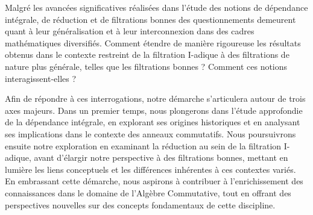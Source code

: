 Malgré les avancées significatives réalisées dans l'étude des notions de dépendance intégrale, de réduction et de filtrations bonnes des questionnements demeurent quant à leur généralisation et à leur interconnexion dans des cadres mathématiques diversifiés. Comment étendre de manière rigoureuse les résultats obtenus dans le contexte restreint de la filtration I-adique à des filtrations de nature plus générale, telles que les filtrations bonnes ? Comment ces notions interagissent-elles ? 

Afin de répondre à ces interrogations, notre démarche s'articulera autour de trois axes majeurs. Dans un premier temps, nous plongerons dans l'étude approfondie de la dépendance intégrale, en explorant ses origines historiques et en analysant ses implications dans le contexte des anneaux commutatifs. Nous poursuivrons ensuite notre exploration en examinant la réduction au sein de la filtration I-adique, avant d'élargir notre perspective à des filtrations bonnes, mettant en lumière les liens conceptuels et les différences inhérentes à ces contextes variés. En embrassant cette démarche, nous aspirons à contribuer à l'enrichissement des connaissances dans le domaine de l'Algèbre Commutative, tout en offrant des perspectives nouvelles sur des concepts fondamentaux de cette discipline.


